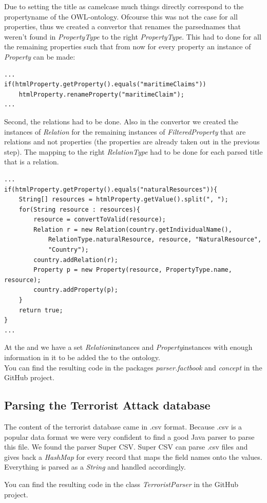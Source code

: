 \documentclass{article}
\begin{document}
Due to setting the title as camelcase much things directly correspond to the propertyname of the OWL-ontology.
Ofcourse this was not the case for all properties, thus we created a convertor that renames the parsednames that weren't found in \textit{PropertyType} to the right \textit{PropertyType}. This had to done for all the remaining properties such that from now for every property an instance of \textit{Property} can be made:
\begin{lstlisting}
...
if(htmlProperty.getProperty().equals("maritimeClaims"))
	htmlProperty.renameProperty("maritimeClaim");
...
\end{lstlisting}
Second, the relations had to be done. Also in the convertor we created the instances of \textit{Relation} for the remaining instances of \textit{FilteredProperty} that are relations and not properties (the properties are already taken out in the previous step).
The mapping to the right \textit{RelationType} had to be done for each parsed title that is a relation.
\begin{lstlisting}
...
if(htmlProperty.getProperty().equals("naturalResources")){
	String[] resources = htmlProperty.getValue().split(", ");
	for(String resource : resources){
		resource = convertToValid(resource);
		Relation r = new Relation(country.getIndividualName(), 
			RelationType.naturalResource, resource, "NaturalResource", 
			"Country");
		country.addRelation(r);
		Property p = new Property(resource, PropertyType.name, resource);
		country.addProperty(p);
	}
	return true;
}
...
\end{lstlisting}
At the and we have a set \textit{Relation}instances and \textit{Property}instances with enough information in it to be added the to the ontology.
\\You can find the resulting code in the packages \textit{parser.factbook} and \textit{concept} in the GitHub project\cite{githubproject}.

\subsection{Parsing the Terrorist Attack database}
\label{sec:terrorist_db}
The content of the terrorist database came in .csv format. Because .csv is a popular data format we were very confident to find a good Java parser to parse this file. We found the parser Super CSV\cite{supercsv}. Super CSV can parse .csv files and gives back a \textit{HashMap} for every record that maps the field names onto the values. Everything is parsed as a \textit{String} and handled accordingly.\par
You can find the resulting code in the class \textit{TerroristParser} in the GitHub project\cite{githubproject}.
\end{document}
